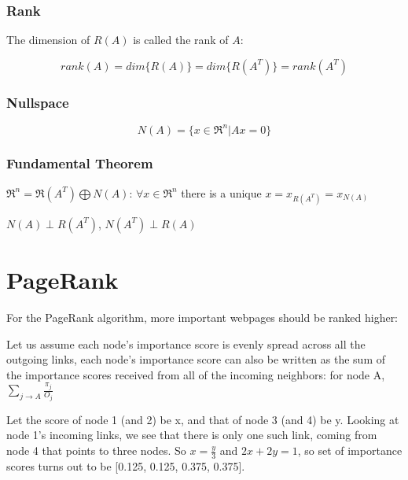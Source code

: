 \subsubsection{Rank}

The dimension of $R(A)$ is called the rank of $A$:

\begin{equation*}
rank(A) = dim\{R(A)\} = dim\{R(A^T)\} = rank(A^T)
\end{equation*}

\subsubsection{Nullspace} 

\begin{equation*}
N(A) = \{x\in \Re^n | Ax = 0\}
\end{equation*}

\subsubsection{Fundamental Theorem}
$\Re^n = \Re(A^T) \bigoplus N(A)$: $\forall x\in \Re^n$ there is a unique $x = x_{R(A^T)} = x_{N(A)}$ 

$N(A) \perp R(A^T)$, $N(A^T) \perp R(A)$


\section{PageRank}


For the PageRank algorithm, more important webpages should be ranked higher:


Let us assume each node's importance score is evenly spread across all the outgoing links, each node’s importance score can also be written as the sum of the importance scores received from all of the incoming neighbors: for node A, $\sum_{j \rightarrow A}\frac{\pi_j}{O_j}$



Let the score of node 1 (and 2) be x, and that of node 3 (and 4) be y. Looking at node 1’s incoming links, we see that there is only one such link, coming from node 4 that points to three nodes. So $x = \frac{y}{3}$ and $2x + 2y = 1$, so set of importance scores turns out to be [0.125, 0.125, 0.375, 0.375].

